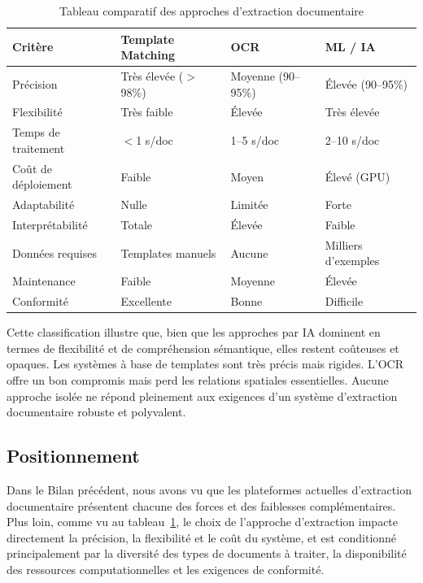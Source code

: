 \begin{table}[H]
    \centering
    \caption{Tableau comparatif des approches d'extraction documentaire}
    \begin{tabular}{|l|l|l|l|}
        \hline
        \rowcolor[HTML]{FFCCCC}
        \textbf{Critère} & \textbf{Template Matching} & \textbf{OCR} & \textbf{ML / IA} \\ \hline
        Précision & Très élevée ($>$98\%) & Moyenne (90--95\%) & Élevée (90--95\%) \\ \hline
        Flexibilité & Très faible & Élevée & Très élevée \\ \hline
        Temps de traitement & $<$1 s/doc & 1--5 s/doc & 2--10 s/doc \\ \hline
        Coût de déploiement & Faible & Moyen & Élevé (GPU) \\ \hline
        Adaptabilité & Nulle & Limitée & Forte \\ \hline
        Interprétabilité & Totale & Élevée & Faible \\ \hline
        Données requises & Templates manuels & Aucune & Milliers d'exemples \\ \hline
        Maintenance & Faible & Moyenne & Élevée \\ \hline
        Conformité & Excellente & Bonne & Difficile \\ \hline
    \end{tabular}
    \label{tab:approaches}
\end{table}

Cette classification illustre que, bien que les approches par IA dominent en termes de flexibilité et de compréhension sémantique, elles restent coûteuses et opaques. Les systèmes à base de templates sont très précis mais rigides. L'OCR offre un bon compromis mais perd les relations spatiales essentielles. Aucune approche isolée ne répond pleinement aux exigences d'un système d'extraction documentaire robuste et polyvalent.


\subsection{Positionnement}

Dans le Bilan précédent, nous avons vu que les plateformes actuelles d'extraction documentaire présentent chacune des forces et des faiblesses complémentaires. Plus loin, comme vu au tableau~\ref{tab:approaches}, le choix de l'approche d'extraction impacte directement la précision, la flexibilité et le coût du système, et est conditionné principalement par la diversité des types de documents à traiter, la disponibilité des ressources computationnelles et les exigences de conformité.

